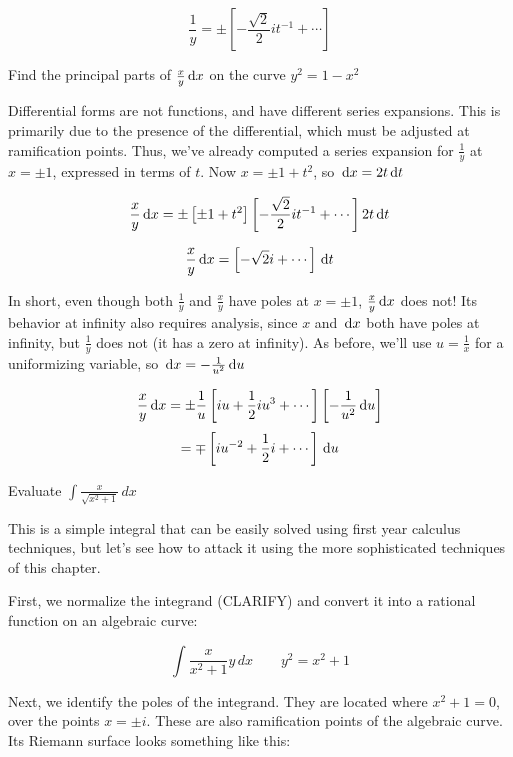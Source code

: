 $$\frac{1}{y} = \pm\left[ -\frac{\sqrt{2}}{2} it^{-1} + \cdots \right]$$

\endexample

%
%
%

\example Find the principal parts of $\frac{x}{y} \,\mathrm{d} x$ on the curve
$y^2 = 1 - x^2$

Differential forms are not functions, and have different series
expansions.  This is primarily due to the presence of the
differential, which must be adjusted at ramification points.  Thus,
we've already computed a series expansion for $\frac{1}{y}$ at $x=\pm
1$, expressed in terms of $t$.  Now $x=\pm 1 + t^2$, so $\,\mathrm{d} x=2t\,\mathrm{d}
t$

$$\frac{x}{y} \,\mathrm{d} x = \pm \left[\pm 1 + t^2 \right] \left[ -\frac{\sqrt{2}}{2} it^{-1} + \cdots \right] 2t \,\mathrm{d} t$$

$$\frac{x}{y} \,\mathrm{d} x = \left[ -\sqrt{2} i + \cdots \right] \,\mathrm{d} t$$

In short, even though both $\frac{1}{y}$ and $\frac{x}{y}$ have poles
at $x=\pm 1$, $\frac{x}{y} \,\mathrm{d} x$ does not!  Its behavior at infinity
also requires analysis, since $x$ and $\,\mathrm{d} x$ both have poles at
infinity, but $\frac{1}{y}$ does not (it has a zero at infinity).
As before, we'll use $u=\frac{1}{x}$ for a uniformizing variable,
so $\,\mathrm{d} x = -\frac{1}{u^2} \,\mathrm{d} u$

$$\frac{x}{y} \,\mathrm{d} x = \pm \frac{1}{u} \left[ i u + \frac{1}{2} i u^3 + \cdots \right] \left[-\frac{1}{u^2} \,\mathrm{d} u\right]$$
$$ = \mp \left[ i u^{-2} + \frac{1}{2} i + \cdots \right] \,\mathrm{d} u$$


\endexample

\example Evaluate $\int \frac{x}{\sqrt{x^2+1}}\,dx$

This is a simple integral that can be easily solved using first year
calculus techniques, but let's see how to attack it using the more
sophisticated techniques of this chapter.

First, we normalize the integrand (CLARIFY) and convert it into
a rational function on an algebraic curve:

$$\int \frac{x}{x^2+1}y\,dx\qquad y^2=x^2+1$$

Next, we identify the poles of the integrand.  They are located
where $x^2+1=0$, over the points $x=\pm i$.  These are also
ramification points of the algebraic curve.  Its Riemann surface
looks something like this:

